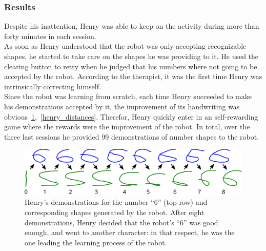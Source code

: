 \documentclass{article}
\begin{document}
\subsubsection{Results}
Despite his inattention, Henry was able to keep on the activity during more than
forty minutes in each session.\\

As soon as Henry understood that the robot was only accepting recognizable
shapes, he started to take care on the shapes he was providing to it. He used the
clearing button to retry when he judged that his numbers where not going to be
accepted by the robot. According to the therapist, it was the first time Henry
was intrinsically correcting himself.\\

Since the robot was learning from scratch, each time Henry succeeded to make his
demonstrations accepted by it, the improvement of its handwriting was
obvious~\ref{learning_6_demos},~\ref{henry_distances}.
Therefor, Henry quickly enter in an self-rewarding game where the rewards were
the improvement of the robot. In total, over the three last sessions he provided 99
demonstrations of number shapes to the robot.

\begin{figure}
    \centering
    \includegraphics[width=0.9\linewidth]{learning_6_demos}
    \caption{\small Henry's demonstrations for the number ``6'' (top row) and
        corresponding shapes generated by the robot. After eight demonstrations,
        Henry decided that the robot's ``6'' was good enough, and went to
    another character: in that respect, he was the one leading the learning
process of the robot.}
    \label{learning_6_demos}
\end{figure}
\end{document}
